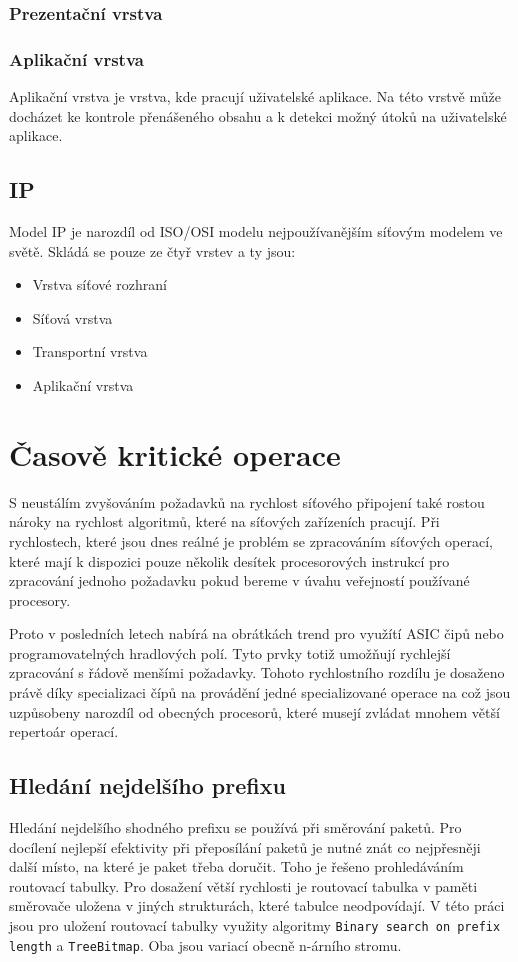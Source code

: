 \subsubsection{Prezentační vrstva}


\subsubsection{Aplikační vrstva}
Aplikační vrstva je vrstva, kde pracují uživatelské aplikace.
Na této vrstvě může docházet ke kontrole přenášeného obsahu a k detekci možný útoků na uživatelské aplikace.

\subsection{IP}
Model IP je narozdíl od ISO/OSI modelu nejpoužívanějším síťovým modelem ve světě.
Skládá se pouze ze čtyř vrstev a ty jsou:

\begin{itemize}
\item{Vrstva síťové rozhraní}
\item{Síťová vrstva}
\item{Transportní vrstva}
\item{Aplikační vrstva}
\end{itemize}

\section{Časově kritické operace}
S neustálím zvyšováním požadavků na rychlost síťového připojení také rostou nároky na rychlost
algoritmů, které na síťových zařízeních pracují. Při rychlostech, které jsou dnes reálné je problém se zpracováním
síťových operací, které mají k dispozici pouze několik desítek procesorových instrukcí pro zpracování jednoho požadavku
pokud bereme v úvahu veřejností používané procesory.

Proto v posledních letech nabírá na obrátkách trend pro využítí ASIC čipů nebo programovatelných hradlových polí.
Tyto prvky totiž umožňují rychlejší zpracování s řádově menšími požadavky.
Tohoto rychlostního rozdílu je dosaženo právě díky specializaci čípů na provádění jedné specializované operace na což jsou uzpůsobeny
narozdíl od obecných procesorů, které musejí zvládat mnohem větší repertoár operací.

\subsection{Hledání nejdelšího prefixu}
Hledání nejdelšího shodného prefixu se používá při směrování paketů.
Pro docílení nejlepší efektivity při přeposílání paketů je nutné znát co nejpřesněji další místo, na které je paket třeba doručit.
Toho je řešeno prohledáváním routovací tabulky.
Pro dosažení větší rychlosti je routovací tabulka v paměti směrovače uložena v jiných strukturách, které tabulce neodpovídají.
V této práci jsou pro uložení routovací tabulky využity algoritmy {\tt Binary search on prefix length} a {\tt TreeBitmap}.
Oba jsou variací obecně n-árního stromu.

